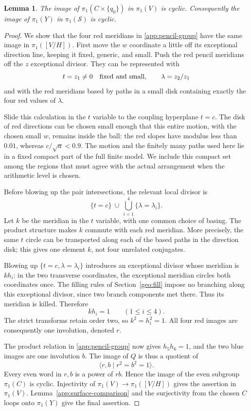\documentclass[11pt,reqno]{amsart}
\numberwithin{equation}{section}
\newtheorem{lemma}[theorem]{Lemma}
\theoremstyle{definition}
\theoremstyle{remark}
\begin{document}
\begin{lemma}\label{app:cyclic-upper}
The image of $\pi_1(C\times\{q_0\})$ in $\pi_1(V)$ is cyclic.
Consequently the image of $\pi_1(Y)$ in $\pi_1(\mathcal S)$ is cyclic.
\end{lemma}

\begin{proof}
We show that the four red meridians in \eqref{app:pencil-group} have
the same image in $\pi_1([V/H])$.  First move the $w$ coordinate a little
off its exceptional direction line, keeping it fixed, generic, and
small.  Push the red pencil meridians off the $z$ exceptional divisor.
They can be represented with
\[
 t=z_1\ne0\quad\hbox{fixed and small},\qquad
 \lambda=z_2/z_1
\]
and with the red meridians based by paths in a small disk containing
exactly the four red values of $\lambda$.

Slide this calculation in the $t$ variable to the coupling hyperplane
$t=c$.  The disk of red directions can be chosen small enough that
this entire motion, with the chosen small $w$, remains inside the
ball: the red slopes have modulus less than $0.01$, whereas
$c/\sqrt a<0.9$.  The motion and the finitely many paths used here lie
in a fixed compact part of the full finite model.  We include this
compact set among the regions that must agree with the actual
arrangement when the arithmetic level is chosen.

Before blowing up the pair intersections, the relevant local divisor
is
\[
 \{t=c\}\ \cup\ \bigcup_{i=1}^4\{\lambda=\lambda_i\}.
\]
Let $k$ be the meridian in the $t$ variable, with one common choice of
basing.  The product structure makes $k$ commute with each red
meridian.  More precisely, the same $t$ circle can be transported along
each of the based paths in the direction disk; this gives one element
$k$, not four unrelated conjugates.

Blowing up $\{t=c,\lambda=\lambda_i\}$ introduces an exceptional
divisor whose meridian is $kh_i$: in the two transverse coordinates,
the exceptional meridian circles both coordinates once.  The filling
rules of Section~\ref{geo:fill} impose no branching along this
exceptional divisor, since two branch components met there.  Thus its
meridian is killed.  Therefore
\[
 kh_i=1\qquad(1\le i\le4).
\]
The strict transforms retain order two, so $k^2=h_i^2=1$.  All four
red images are consequently one involution, denoted $r$.

The product relation in \eqref{app:pencil-group} now gives
$h_5h_6=1$, and the two blue images are one involution $b$.  The image
of $Q$ is thus a quotient of
\[
 \langle r,b\mid r^2=b^2=1\rangle.
\]
Every even word in $r,b$ is a power of $rb$.  Hence the image of the
even subgroup $\pi_1(C)$ is cyclic.  Injectivity of
$\pi_1(V)\to\pi_1([V/H])$ gives the assertion in $\pi_1(V)$.
Lemma~\ref{app:surface-comparison} and the surjectivity from the chosen
$C$ loops onto $\pi_1(Y)$ give the final assertion.
\end{proof}
\end{document}
